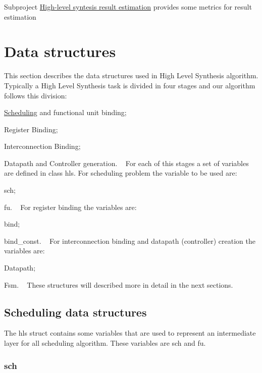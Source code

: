 \begin{DoxyItemize}
\item Subproject \hyperlink{src_HLS_estimation}{High-\/level syntesis result estimation} provides some metrics for result estimation
\end{DoxyItemize}\hypertarget{src_HLS_page_src_HLS_data_structure}{}\section{Data structures}\label{src_HLS_page_src_HLS_data_structure}
This section describes the data structures used in High Level Synthesis algorithm. Typically a High Level Synthesis task is divided in four stages and our algorithm follows this division\+:
\begin{DoxyItemize}
\item \hyperlink{classScheduling}{Scheduling} and functional unit binding;
\item Register Binding;
\item Interconnection Binding;
\item Datapath and Controller generation. ~\newline
 For each of this stages a set of variables are defined in class hls. For scheduling problem the variable to be used are\+:
\item sch;
\item fu. ~\newline
 For register binding the variables are\+:
\item bind;
\item bind\+\_\+const. ~\newline
 For interconnection binding and datapath (controller) creation the variables are\+:
\item Datapath;
\item Fsm. ~\newline
 These structures will described more in detail in the next sections. 
\end{DoxyItemize}\hypertarget{src_HLS_page_src_HLS_data_structure_scheduling}{}\subsection{Scheduling data structures}\label{src_HLS_page_src_HLS_data_structure_scheduling}
The hls struct contains some variables that are used to represent an intermediate layer for all scheduling algorithm. These variables are sch and fu. \hypertarget{src_HLS_page_sch}{}\subsubsection{sch}\label{src_HLS_page_sch}

